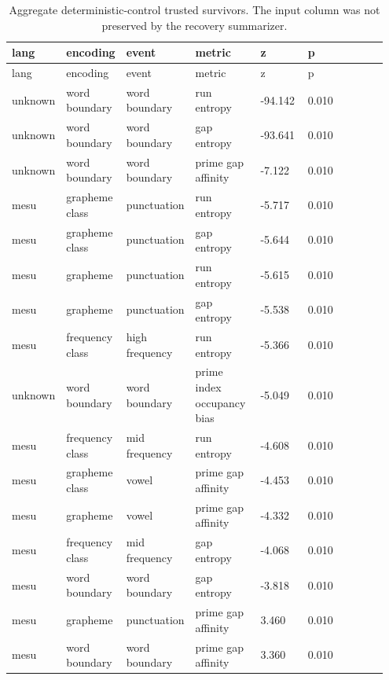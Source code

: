 \documentclass[11pt,a4paper]{article}
\begin{document}
\begingroup
\scriptsize
\setlength{\tabcolsep}{3pt}
\renewcommand{\arraystretch}{1.12}
\begin{longtable}{p{0.11\linewidth}p{0.13\linewidth}p{0.13\linewidth}p{0.18\linewidth}p{0.13\linewidth}p{0.13\linewidth}p{0.14\linewidth}}
\caption{Aggregate deterministic-control trusted survivors. The input column was not preserved by the recovery summarizer.}\label{tab:controls}\\
\toprule
lang & encoding & event & metric & z & p \\
\midrule
\endfirsthead
\toprule
lang & encoding & event & metric & z & p \\
\midrule
\endhead
unknown & word boundary & word boundary & run entropy & -94.142 & 0.010 \\
unknown & word boundary & word boundary & gap entropy & -93.641 & 0.010 \\
unknown & word boundary & word boundary & prime gap affinity & -7.122 & 0.010 \\
mesu & grapheme class & punctuation & run entropy & -5.717 & 0.010 \\
mesu & grapheme class & punctuation & gap entropy & -5.644 & 0.010 \\
mesu & grapheme & punctuation & run entropy & -5.615 & 0.010 \\
mesu & grapheme & punctuation & gap entropy & -5.538 & 0.010 \\
mesu & frequency class & high frequency & run entropy & -5.366 & 0.010 \\
unknown & word boundary & word boundary & prime index occupancy bias & -5.049 & 0.010 \\
mesu & frequency class & mid frequency & run entropy & -4.608 & 0.010 \\
mesu & grapheme class & vowel & prime gap affinity & -4.453 & 0.010 \\
mesu & grapheme & vowel & prime gap affinity & -4.332 & 0.010 \\
mesu & frequency class & mid frequency & gap entropy & -4.068 & 0.010 \\
mesu & word boundary & word boundary & gap entropy & -3.818 & 0.010 \\
mesu & grapheme & punctuation & prime gap affinity & 3.460 & 0.010 \\
mesu & word boundary & word boundary & prime gap affinity & 3.360 & 0.010 \\
\bottomrule
\end{longtable}
\endgroup
\end{document}
